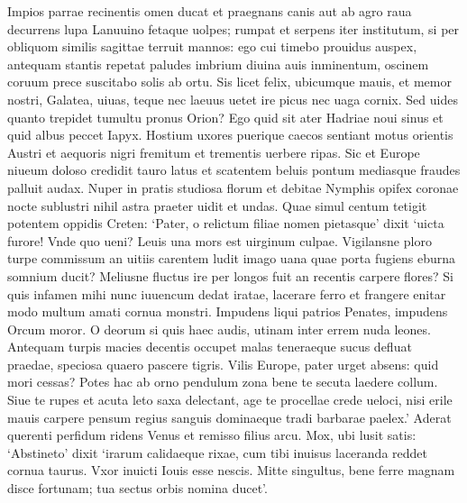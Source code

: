 \documentclass{book}
\newenvironment {carmen} [1] [\relax] 
  {\Titulus \Versus \incipit*\numerus{1}#1}
  {\endVersus}
\newcommand {\Sapphic}   {\Forma \strophae {0 \poena 00 \poena 1}}
\begin{document}
\begin{carmen}[\Sapphic]


Impios parrae recinentis omen
 ducat et praegnans canis aut ab agro
 raua decurrens lupa Lanuuino
      fetaque uolpes; 
rumpat et serpens iter institutum,
 si per obliquom similis sagittae
 terruit mannos: ego cui timebo
      prouidus auspex, 
antequam stantis repetat paludes
 imbrium diuina auis inminentum,               
 oscinem coruum prece suscitabo
      solis ab ortu. 
Sis licet felix, ubicumque mauis,
 et memor nostri, Galatea, uiuas,
 teque nec laeuus uetet ire picus               
      nec uaga cornix. 
Sed uides quanto trepidet tumultu
 pronus Orion? Ego quid sit ater
 Hadriae noui sinus et quid albus
      peccet Iapyx.                
Hostium uxores puerique caecos
 sentiant motus orientis Austri et
 aequoris nigri fremitum et trementis
      uerbere ripas. 
Sic et Europe niueum doloso               
 credidit tauro latus et scatentem
 beluis pontum mediasque fraudes
      palluit audax. 
Nuper in pratis studiosa florum et
 debitae Nymphis opifex coronae               
 nocte sublustri nihil astra praeter
      uidit et undas. 
Quae simul centum tetigit potentem
 oppidis Creten: `Pater, o relictum
 filiae nomen pietasque' dixit               
      `uicta furore! 
Vnde quo ueni? Leuis una mors est
 uirginum culpae. Vigilansne ploro
 turpe commissum an uitiis carentem
      ludit imago                
uana quae porta fugiens eburna
 somnium ducit? Meliusne fluctus
 ire per longos fuit an recentis
      carpere flores? 
Si quis infamen mihi nunc iuuencum               
 dedat iratae, lacerare ferro et
 frangere enitar modo multum amati
      cornua monstri. 
Impudens liqui patrios Penates,
 impudens Orcum moror. O deorum               
 si quis haec audis, utinam inter errem
      nuda leones. 
Antequam turpis macies decentis
 occupet malas teneraeque sucus
 defluat praedae, speciosa quaero               
      pascere tigris. 
Vilis Europe, pater urget absens:
 quid mori cessas? Potes hac ab orno
 pendulum zona bene te secuta
      laedere collum.                
Siue te rupes et acuta leto
 saxa delectant, age te procellae
 crede ueloci, nisi erile mauis
      carpere pensum 
regius sanguis dominaeque tradi               
 barbarae paelex.' Aderat querenti
 perfidum ridens Venus et remisso
      filius arcu. 
Mox, ubi lusit satis: `Abstineto'
 dixit `irarum calidaeque rixae,               
 cum tibi inuisus laceranda reddet
      cornua taurus. 
Vxor inuicti Iouis esse nescis.
 Mitte singultus, bene ferre magnam
 disce fortunam; tua sectus orbis               
      nomina ducet'. 

\end{carmen}
\end{document}
